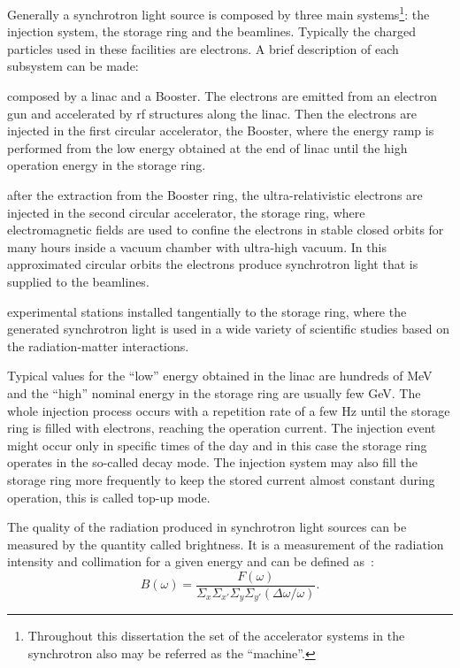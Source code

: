 Generally a synchrotron light source is composed by three main systems\footnote{Throughout this dissertation the set of the accelerator systems in the synchrotron also may be referred as the ``machine''.}: the injection system, the storage ring and the beamlines. Typically the charged particles used in these facilities are electrons. A brief description of each subsystem can be made:
\begin{description}[align=left]
    \item[Injection system:] composed by a \gls{linac} and a Booster. The electrons are emitted from an electron gun and accelerated by \gls{rf} structures along the \gls{linac}. Then the electrons are injected in the first circular accelerator, the Booster, where the energy ramp is performed from the low energy obtained at the end of \gls{linac} until the high operation energy in the storage ring.
    \item[Storage ring:] after the extraction from the Booster ring, the ultra-relativistic electrons are injected in the second circular accelerator, the storage ring, where electromagnetic fields are used to confine the electrons in stable closed orbits for many hours inside a vacuum chamber with ultra-high vacuum. In this approximated circular orbits the electrons produce synchrotron light that is supplied to the beamlines.
    \item[Beamlines:] experimental stations installed tangentially to the storage ring, where the generated synchrotron light is used in a wide variety of scientific studies based on the radiation-matter interactions.
\end{description}

Typical values for the ``low'' energy obtained in the \gls{linac} are hundreds of \si{\mega\electronvolt} and the ``high'' nominal energy in the storage ring are usually few \si{\giga\electronvolt}. The whole injection process occurs with a repetition rate of a few \si{\hertz} until the storage ring is filled with electrons, reaching the operation current. The injection event might occur only in specific times of the day and in this case the storage ring operates in the so-called decay mode. The injection system may also fill the storage ring more frequently to keep the stored current almost constant during operation, this is called top-up mode.

The quality of the radiation produced in synchrotron light sources can be measured by the quantity called brightness. It is a measurement of the radiation intensity and collimation for a given energy and can be defined as~\cite{huang2013}:
\begin{equation}
    B(\omega) = \dfrac{F(\omega)}{\Sigma_x \Sigma_{x'} \Sigma_y \Sigma_{y'} \left(\Delta \omega /\omega\right)}.
\end{equation}

